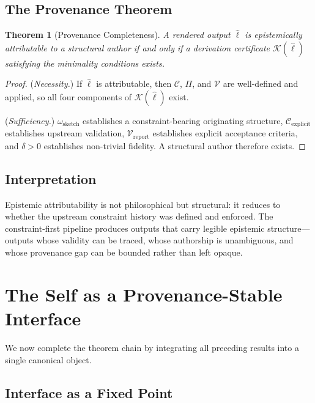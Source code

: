 \documentclass[12pt, a4paper]{article}
\theoremstyle{plain}
\newtheorem{theorem}{Theorem}[section]
\theoremstyle{definition}
\theoremstyle{remark}
\begin{document}
\subsection{The Provenance Theorem}

\begin{theorem}[Provenance Completeness]
A rendered output $\hat{\ell}$ is epistemically attributable to a structural author if and only if a derivation certificate $\mathcal{K}(\hat{\ell})$ satisfying the minimality conditions exists.
\end{theorem}

\begin{proof}
(\textit{Necessity.}) If $\hat{\ell}$ is attributable, then $\mathcal{C}$, $\Pi$, and $\mathcal{V}$ are well-defined and applied, so all four components of $\mathcal{K}(\hat{\ell})$ exist.

(\textit{Sufficiency.}) $\omega_{\mathrm{sketch}}$ establishes a constraint-bearing originating structure, $\mathcal{C}_{\mathrm{explicit}}$ establishes upstream validation, $\mathcal{V}_{\mathrm{report}}$ establishes explicit acceptance criteria, and $\delta > 0$ establishes non-trivial fidelity. A structural author therefore exists.
\end{proof}

\subsection{Interpretation}

Epistemic attributability is not philosophical but structural: it reduces to whether the upstream constraint history was defined and enforced. The constraint-first pipeline produces outputs that carry legible epistemic structure---outputs whose validity can be traced, whose authorship is unambiguous, and whose provenance gap can be bounded rather than left opaque.

\section{The Self as a Provenance-Stable Interface}

We now complete the theorem chain by integrating all preceding results into a single canonical object.

\subsection{Interface as a Fixed Point}
\end{document}

